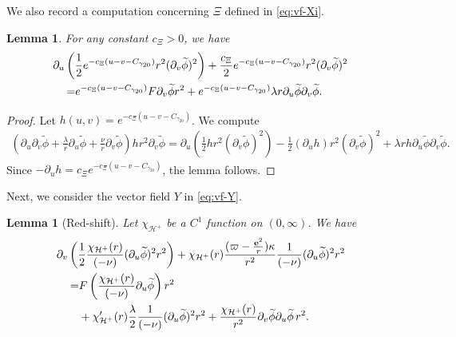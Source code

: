 \documentclass[10pt, reqno]{amsart}
\newtheorem{lemma}[theorem]{Lemma}
\theoremstyle{definition}
\theoremstyle{remark}
\theoremstyle{conjecture}
\numberwithin{equation}{section}
\newcommand{\rd}{\partial}
\newcommand{\0}{\emptyset}
\newcommand{\gmm}{\gamma}
\newcommand{\kpp}{\kappa}
\newcommand{\lmb}{\lambda}
\newcommand{\bfe}{{\bf e}}
\newcommand{\calH}{\mathcal H}
\newcommand{\dur}{\nu}
\newcommand{\dvr}{\lmb}
\newcommand{\EH}{\calH^{+}}
\newcommand{\e}{\bfe}							%
\newcommand{\phibg}{\overline{\phi}}				%
\newcommand{\phidf}{\widetilde{\phi}}				%
\begin{document}
We also record a computation concerning $\Xi$ defined in \eqref{eq:vf-Xi}.
\begin{lemma} \label{lem:en-id-Xi}
For any constant $c_{\Xi} > 0$, we have
\begin{equation} \label{eq:en-id-Xi}
\begin{aligned}
& \hskip-2em
	\rd_{u} \left(\frac{1}{2} e^{- c_{\Xi}(u - v - C_{\gmm_{20}})} r^{2} (\rd_{v} \phidf)^{2} \right)
	+ \frac{c_{\Xi}}{2} e^{- c_{\Xi}(u - v - C_{\gmm_{20}})} r^{2} (\rd_{v} \phidf)^{2} \\
	= & e^{- c_{\Xi}(u - v - C_{\gmm_{20}})} F  \rd_{v} \phidf r^{2}
	+ e^{- c_{\Xi}(u - v - C_{\gmm_{20}})} \dvr r \rd_{u} \phidf \rd_{v} \phidf.
\end{aligned}
\end{equation}
\end{lemma}
\begin{proof}
Let $h(u, v) = e^{-c_{\Xi}(u - v - C_{\gmm_{20}})}$. We compute
\begin{align*}
	\left(\rd_{u} \rd_{v} \phidf + \frac{\dvr}{r} \rd_{u} \phidf + \frac{\dur}{r} \rd_{v} \phidf \right) h r^{2} \rd_{v} \phidf 
	= \rd_{u} \left(\frac{1}{2} h r^{2} (\rd_{v} \phidf)^{2} \right) 
	- \frac{1}{2} (\rd_{u} h) r^{2} (\rd_{v} \phidf)^{2}
	+ \dvr r h \rd_{u} \phidf \rd_{v} \phidf.
\end{align*}
Since $- \rd_{u} h = c_{\Xi} e^{- c_{\Xi} (u - v - C_{\gmm_{20}})}$, the lemma follows. \qedhere
\end{proof}

Next, we consider the vector field $Y$ in \eqref{eq:vf-Y}.
\begin{lemma}[Red-shift] \label{lem:red-shift}
Let $\chi_{\EH}$ be a $C^{1}$ function on $(0, \infty)$. We have
\begin{equation} \label{eq:en-id-Y}
\begin{aligned}
& \hskip-2em
	 \rd_{v} \left( \frac{1}{2}\frac{\chi_{\EH}(r)}{(-\dur)} (\rd_{u} \phidf)^{2}  r^{2}  \right) 
	 + \chi_{\EH}(r) \frac{(\varpi - \frac{\e^{2}}{r}) \kpp}{r^{2}}  \frac{1}{(-\dur)} (\rd_{u} \phidf)^{2} r^{2} \\
	= & F \left( \frac{\chi_{\EH}(r)}{(-\dur)} \rd_{u} \phidf \right) r^{2} \\
	& + \chi_{\EH}' (r)\frac{\dvr}{2}  \frac{1}{(-\dur)} (\rd_{u} \phidf)^{2} r^{2}
	+ \frac{\chi_{\EH}(r)}{r^{2}} \rd_{v} \phidf \rd_{u} \phidf \, r^{2}.
\end{aligned}
\end{equation}
\end{lemma}
\end{document}
